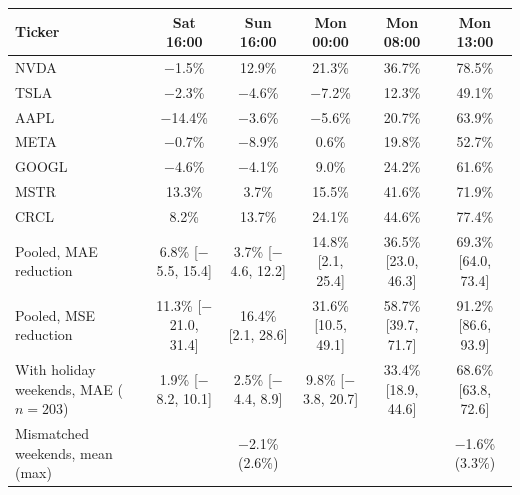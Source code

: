 \begin{tabular}{lccccc}
\toprule
Ticker & Sat 16:00 & Sun 16:00 & Mon 00:00 & Mon 08:00 & Mon 13:00 \\
\midrule
NVDA & $-$1.5\% & 12.9\% & 21.3\% & 36.7\% & 78.5\% \\
TSLA & $-$2.3\% & $-$4.6\% & $-$7.2\% & 12.3\% & 49.1\% \\
AAPL & $-$14.4\% & $-$3.6\% & $-$5.6\% & 20.7\% & 63.9\% \\
META & $-$0.7\% & $-$8.9\% & 0.6\% & 19.8\% & 52.7\% \\
GOOGL & $-$4.6\% & $-$4.1\% & 9.0\% & 24.2\% & 61.6\% \\
MSTR & 13.3\% & 3.7\% & 15.5\% & 41.6\% & 71.9\% \\
CRCL & 8.2\% & 13.7\% & 24.1\% & 44.6\% & 77.4\% \\
\midrule
Pooled, MAE reduction & 6.8\% [$-$5.5, 15.4] & 3.7\% [$-$4.6, 12.2] & 14.8\% [2.1, 25.4] & 36.5\% [23.0, 46.3] & 69.3\% [64.0, 73.4] \\
Pooled, MSE reduction & 11.3\% [$-$21.0, 31.4] & 16.4\% [2.1, 28.6] & 31.6\% [10.5, 49.1] & 58.7\% [39.7, 71.7] & 91.2\% [86.6, 93.9] \\
With holiday weekends, MAE ($n = 203$) & 1.9\% [$-$8.2, 10.1] & 2.5\% [$-$4.4, 8.9] & 9.8\% [$-$3.8, 20.7] & 33.4\% [18.9, 44.6] & 68.6\% [63.8, 72.6] \\
Mismatched weekends, mean (max) & & $-$2.1\% (2.6\%) & & & $-$1.6\% (3.3\%) \\
\bottomrule
\end{tabular}
